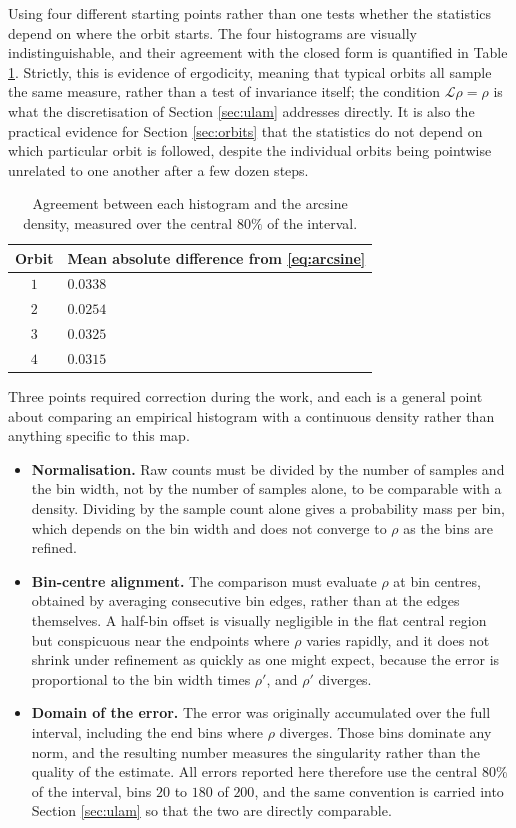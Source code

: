 \documentclass[11pt,a4paper]{article}
\theoremstyle{definition}
\theoremstyle{remark}
\newcommand{\PF}{\mathcal{L}}
\begin{document}
Using four different starting points rather than one tests whether the
statistics depend on where the orbit starts. The four histograms are visually
indistinguishable, and their agreement with the closed form is quantified in
Table \ref{tab:density}. Strictly, this is evidence of ergodicity, meaning
that typical orbits all sample the same measure, rather than a test of
invariance itself; the condition $\PF\rho=\rho$ is what the discretisation of
Section \ref{sec:ulam} addresses directly. It is also the practical evidence
for Section \ref{sec:orbits} that the
statistics do not depend on which particular orbit is followed, despite the
individual orbits being pointwise unrelated to one another after a few dozen
steps.

\begin{table}[H]
\centering
\begin{tabular}{cl}
\toprule
Orbit & Mean absolute difference from \eqref{eq:arcsine} \\
\midrule
$1$ & $0.0338$ \\
$2$ & $0.0254$ \\
$3$ & $0.0325$ \\
$4$ & $0.0315$ \\
\bottomrule
\end{tabular}
\caption{Agreement between each histogram and the arcsine density, measured
over the central $80\%$ of the interval.}
\label{tab:density}
\end{table}

Three points required correction during the work, and each is a general point
about comparing an empirical histogram with a continuous density rather than
anything specific to this map.

\begin{itemize}
  \item \textbf{Normalisation.} Raw counts must be divided by the number of
    samples and the bin width, not by the number of samples alone, to be
    comparable with a density. Dividing by the sample count alone gives a
    probability mass per bin, which depends on the bin width and does not
    converge to $\rho$ as the bins are refined.
  \item \textbf{Bin-centre alignment.} The comparison must evaluate $\rho$ at
    bin centres, obtained by averaging consecutive bin edges, rather than at
    the edges themselves. A half-bin offset is visually negligible in the flat
    central region but conspicuous near the endpoints where $\rho$ varies
    rapidly, and it does not shrink under refinement as quickly as one might
    expect, because the error is proportional to the bin width times $\rho'$,
    and $\rho'$ diverges.
  \item \textbf{Domain of the error.} The error was originally accumulated
    over the full interval, including the end bins where $\rho$ diverges.
    Those bins dominate any norm, and the resulting number measures the
    singularity rather than the quality of the estimate. All errors reported
    here therefore use the central $80\%$ of the interval, bins $20$ to $180$
    of $200$, and the same convention is carried into Section \ref{sec:ulam}
    so that the two are directly comparable.
\end{itemize}
\end{document}
